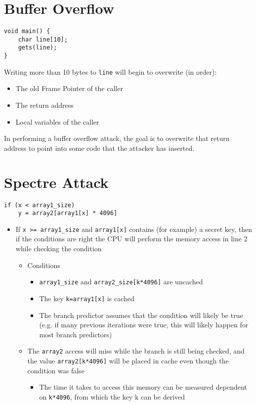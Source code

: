 \documentclass[11pt]{report}
\begin{document}
\section{Buffer Overflow}
\begin{lstlisting}
void main() {
	char line[10];
	gets(line);
}
\end{lstlisting}
Writing more than 10 bytes to \texttt{line} will begin to overwrite (in order):
\begin{itemize}
	\item The old Frame Pointer of the caller
	\item The return address
	\item Local variables of the caller
\end{itemize}
In performing a buffer overflow attack, the goal is to overwrite that return address to point into some code that the attacker has inserted.

\section{Spectre Attack}
\begin{lstlisting}
if (x < array1_size)
	y = array2[array1[x] * 4096]
\end{lstlisting}

\begin{itemize}
	\item If \texttt{x >= array1\_size} and \texttt{array1[x]} contains (for example) a secret key, then if the conditions are right the CPU will perform the memory access in line 2 while checking the condition
	\begin{itemize}
		\item Conditions
		\begin{itemize}
			\item \texttt{array1\_size} and \texttt{array2\_size[k*4096]} are uncached
			\item The key \texttt{k=array1[x]} is cached
			\item The branch predictor assumes that the condition will likely be true (e.g. if many previous iterations were true, this will likely happen for most branch predictors)
		\end{itemize}
		\item The \texttt{array2} access will miss while the branch is still being checked, and the value \texttt{array2[k*4096]} will be placed in cache even though the condition was false
		\begin{itemize}
			\item The time it takes to access this memory can be measured dependent on \texttt{k*4096}, from which the key k can be derived
		\end{itemize}
	\end{itemize}
\end{itemize}
\end{document}
